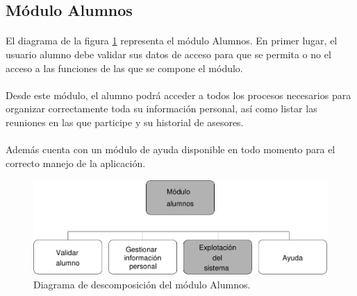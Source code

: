 \subsection{Módulo Alumnos}

  \paragraph{}El diagrama de la figura
  \ref{diagramaDescomposicionAlumnos} representa el módulo Alumnos. En primer
  lugar, el usuario alumno debe validar sus datos de acceso para que se permita
  o no el acceso a las funciones de las que se compone el módulo.

  \paragraph{}Desde este módulo, el alumno podrá acceder a todos los procesos
  necesarios para organizar correctamente toda su información personal, así
  como listar las reuniones en las que participe y su historial de asesores.

  \paragraph{}Además cuenta con un módulo de ayuda disponible en todo momento
  para el correcto manejo de la aplicación.

  \begin{figure}[!ht]
    \begin{center}
      \includegraphics[]{11.Disenyo_Arquitectonico/11.2.Diagramas_Descomposicion/11.2.5.Modulo_alumnos/Diagramas/alumnos.pdf}
      \caption{Diagrama de descomposición del módulo Alumnos.}
      \label{diagramaDescomposicionAlumnos}
    \end{center}
  \end{figure}

